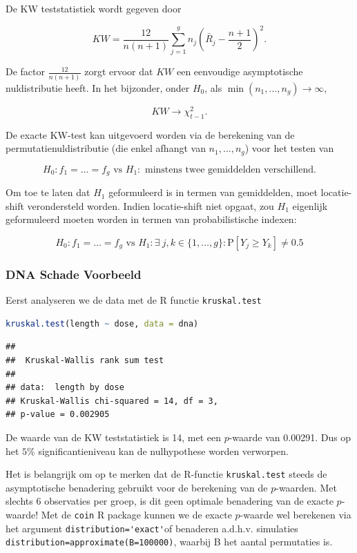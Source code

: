 \documentclass[
  12pt,dutch,coursenotes]{book}
\newcommand{\passthrough}[1]{#1}
\begin{document}
De KW teststatistiek wordt gegeven door

\[
    KW = \frac{12}{n(n+1)}  \sum_{j=1}^g n_j \left(\bar{R}_j - \frac{n+1}{2}\right)^2.
  \]

De factor \(\frac{12}{n(n+1)}\) zorgt ervoor dat \(KW\) een eenvoudige asymptotische nuldistributie heeft. In het bijzonder, onder \(H_0\), als \(\min(n_1,\ldots, n_g)\rightarrow \infty\),

\[
    KW  \rightarrow \chi^2_{t-1}.
  \]

De exacte KW-test kan uitgevoerd worden via de berekening van de permutatienuldistributie (die enkel afhangt van \(n_1, \ldots, n_g\)) voor het testen van

\[H_0: f_1=\ldots=f_g \text{ vs } H_1: \text{ minstens twee gemiddelden verschillend}.\]

Om toe te laten dat \(H_1\) geformuleerd is in termen van gemiddelden, moet locatie-shift verondersteld worden. Indien locatie-shift niet opgaat, zou \(H_1\) eigenlijk geformuleerd moeten worden in termen van probabilistische indexen:

\[H_0: f_1=\ldots=f_g \text{ vs } H_1: \exists\ j,k \in \{1,\ldots,g\} : \text{P}\left[Y_j\geq Y_k\right]\neq 0.5\]

\hypertarget{dna-schade-voorbeeld}{%
\subsubsection{DNA Schade Voorbeeld}\label{dna-schade-voorbeeld}}

Eerst analyseren we de data met de R functie \passthrough{\lstinline!kruskal.test!}

\begin{lstlisting}[language=R]
kruskal.test(length ~ dose, data = dna)
\end{lstlisting}

\begin{lstlisting}
## 
##  Kruskal-Wallis rank sum test
## 
## data:  length by dose
## Kruskal-Wallis chi-squared = 14, df = 3,
## p-value = 0.002905
\end{lstlisting}

De waarde van de KW teststatistiek is 14, met een \(p\)-waarde van 0.00291. Dus op het \(5\%\) significantieniveau kan de nulhypothese worden verworpen.

Het is belangrijk om op te merken dat de R-functie \passthrough{\lstinline!kruskal.test!} steeds de asymptotische benadering gebruikt voor de berekening van de \(p\)-waarden. Met slechts 6 observaties per groep, is dit geen optimale benadering van de exacte \(p\)-waarde!
Met de \passthrough{\lstinline!coin!} R package kunnen we de exacte \(p\)-waarde wel berekenen via het argument \passthrough{\lstinline!distribution='exact'!}of benaderen a.d.h.v. simulaties \passthrough{\lstinline!distribution=approximate(B=100000)!}, waarbij B het aantal permutaties is.
\end{document}
